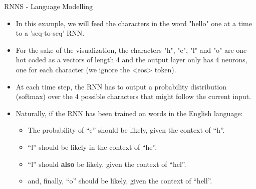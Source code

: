 \begin{vbframe}{RNNS - Language Modelling}
  \begin{itemize}
  \item In this example, we will feed the characters in the word "hello" one at a time to a 'seq-to-seq' RNN.
  \item For the sake of the visualization, the characters "h", "e", "l" and "o" are one-hot coded as a vectors of length 4 and the output layer only has 4 neurons, one for each character (we ignore the <eos> token).
  \item At each time step, the RNN has to output a probability distribution (softmax) over the 4 possible characters that might follow the current input.
  \item Naturally, if the RNN has been trained on words in the English language: 
    \begin{itemize}
      \item The probability of \enquote{e} should be likely, given the context of \enquote{h}.
      \item \enquote{l} should be likely in the context of \enquote{he}.
      \item \enquote{l} should \textbf{also} be likely, given the context of \enquote{hel}.
      \item and, finally, \enquote{o} should be likely, given the context of \enquote{hell}.
    \end{itemize}
  \end{itemize}
\end{vbframe}
